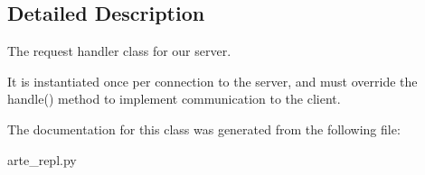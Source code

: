 \subsection{Detailed Description}
The request handler class for our server. 

It is instantiated once per connection to the server, and must override the handle() method to implement communication to the client. 

The documentation for this class was generated from the following file\+:\begin{DoxyCompactItemize}
\item 
arte\+\_\+repl.\+py\end{DoxyCompactItemize}
